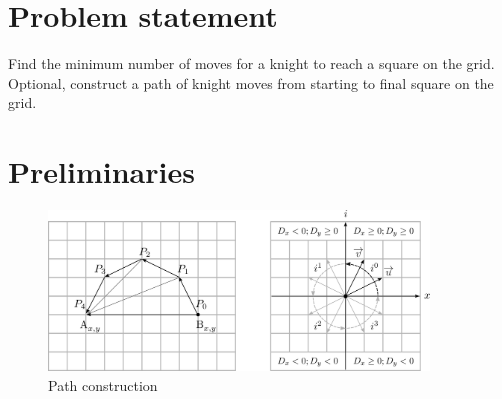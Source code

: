 \documentclass[a4paper, 12pt]{article}
\begin{document}
\section{Problem statement}
Find the minimum number of moves for a knight to reach a square on the grid. Optional, construct a path
of knight moves from starting to final square on the grid.


\section{Preliminaries}
\vspace{-0.5em}
\begin{figure}[H]
  \centering
  \includegraphics[width=0.9\textwidth]{figures/figure-1.png}
  \caption{Path construction}
\end{figure}
\end{document}
